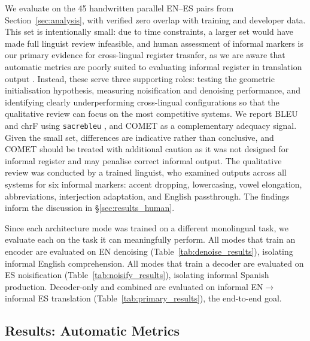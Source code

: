 \documentclass[11pt]{article}
\begin{document}
We evaluate on the 45 handwritten parallel EN--ES pairs from
Section~\ref{sec:analysis}, with verified zero overlap with
training and developer data. This set is intentionally small:
due to time constraints, a larger set would have made full linguist
review infeasible, and human assessment of informal markers
is our primary evidence for cross-lingual register trasnfer, as we are aware that automatic metrics are poorly suited to evaluating informal register in translation output \cite{michel2018mtnt}. Instead, these serve three supporting roles: testing the geometric initialisation hypothesis, measuring noisification and denoising performance, and identifying clearly underperforming cross-lingual configurations so that the qualitative review
can focus on the most competitive systems. We report BLEU and
chrF \citep{popovic2015chrf} using \texttt{sacrebleu}
\citep{post2018sacrebleu}, and COMET \citep{rei-etal-2020-comet}
as a complementary adequacy signal. Given the small set,
differences are indicative rather than conclusive, and COMET
should be treated with additional caution as it was not
designed for informal register and may penalise correct
informal output. The qualitative review was conducted by a
trained linguist, who examined outputs across all systems for
six informal markers: accent dropping, lowercasing, vowel
elongation, abbreviations, interjection adaptation, and English
passthrough. The findings inform the discussion in
\S\ref{sec:results_human}.

Since each architecture mode was trained on a different monolingual task, we
evaluate each on the task it can meaningfully perform. All modes that train an encoder are evaluated on EN denoising (Table~\ref{tab:denoise_results}), isolating informal
English comprehension. All modes that train a
decoder are evaluated on ES noisification (Table~\ref{tab:noisify_results}),
isolating informal Spanish production. Decoder-only and combined
are evaluated on informal EN$\rightarrow$informal ES translation
(Table~\ref{tab:primary_results}), the end-to-end goal.


\subsection{Results: Automatic Metrics}
\label{sec:results_auto}
\end{document}
